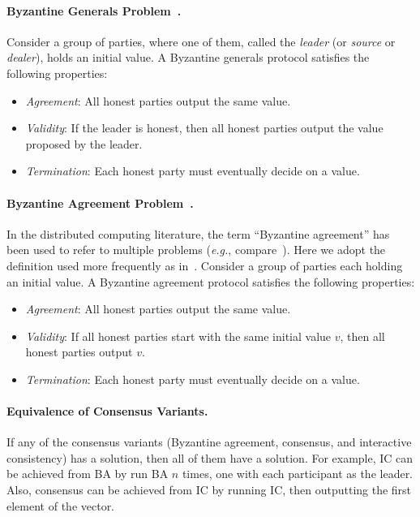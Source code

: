 \documentclass[11pt]{article}
\newcommand{\eg}{\textit{e.g.}}
\theoremstyle{mytheoremstyle}
\begin{document}
\paragraph{Byzantine Generals Problem~\cite{lsp82}.} Consider a group of parties, where one of them, called the \emph{leader} (or \emph{source} or \emph{dealer}), holds an initial value. A Byzantine generals protocol satisfies the following properties:
\begin{itemize}
	\item \emph{Agreement}: All honest parties output the same value. 
	\item \emph{Validity}: If the leader is honest, then all honest parties output the value proposed by the leader.
	\item \emph{Termination}: Each honest party must eventually decide on a value.
\end{itemize}

\paragraph{Byzantine Agreement Problem~\cite{lsp82}.} In the distributed computing literature, the term ``Byzantine agreement'' has been used to refer to multiple problems (\eg, compare~\cite{dffls,lindell:2002:ba}). Here we adopt the definition used more frequently as in~\cite{lindell:2002:ba,king:2016:bae:2906142.2837019}. Consider a group of parties each holding an initial value. A Byzantine agreement protocol satisfies the following properties:
\begin{itemize}
	\item \emph{Agreement}: All honest parties output the same value. 
	\item \emph{Validity}: If all honest parties start with the same initial value $v$, then all honest parties output $v$.
	\item \emph{Termination}: Each honest party must eventually decide on a value.
\end{itemize}

\paragraph{Equivalence of Consensus Variants.} If any of the consensus variants (Byzantine agreement, consensus, and interactive consistency) has a solution, then all of them have a solution. For example, IC can be achieved from BA by run BA $n$ times, one with each participant as the leader. Also, consensus can be achieved from IC by running IC, then outputting the first element of the vector.
\end{document}
